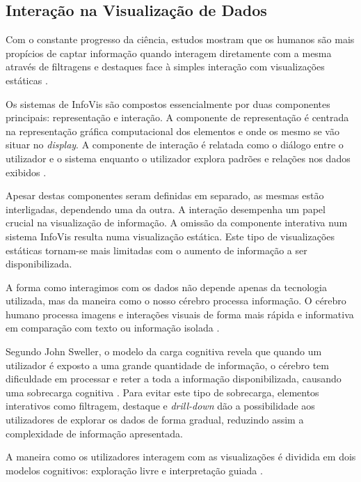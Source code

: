 \subsection{Interação na Visualização de Dados} %
\label{sub:elem_int}

Com o constante progresso da ciência, estudos mostram que os humanos são mais propícios de captar informação quando interagem diretamente com a mesma através de filtragens e destaques face à simples interação com visualizações estáticas \cite{heer2012interactive}. 

Os sistemas de \gls{InfoVis} são compostos essencialmente por duas componentes principais: representação e interação. A componente de representação é centrada na representação gráfica computacional dos elementos e onde os mesmo se vão situar no \textit{display}. A componente de interação é relatada como o diálogo entre o utilizador e o sistema enquanto o utilizador explora padrões e relações nos dados exibidos \cite{yi2007toward}. 

Apesar destas componentes seram definidas em separado, as mesmas estão interligadas, dependendo uma da outra. A interação desempenha um papel crucial na visualização de informação. A omissão da componente interativa num sistema \gls{InfoVis} resulta numa visualização estática. Este tipo de visualizações estáticas tornam-se mais limitadas com o aumento de informação a ser disponibilizada.

A forma como interagimos com os dados não depende apenas da tecnologia utilizada, mas da maneira como o nosso cérebro processa informação. O cérebro humano processa imagens e interações visuais de forma mais rápida e informativa em comparação com texto ou informação isolada \cite{ware2019information}.

Segundo John Sweller, o modelo da carga cognitiva revela que quando um utilizador é exposto a uma grande quantidade de informação, o cérebro tem dificuldade em processar e reter a toda a informação disponibilizada, causando uma sobrecarga cognitiva \cite{sweller1988cognitive}. Para evitar este tipo de sobrecarga, elementos interativos como filtragem, destaque e \textit{drill-down} dão a possibilidade aos utilizadores de explorar os dados de forma gradual, reduzindo assim a complexidade de informação apresentada.

A maneira como os utilizadores interagem com as visualizações é dividida em dois modelos cognitivos: exploração livre e interpretação guiada \cite{munzner2014visualization}.

